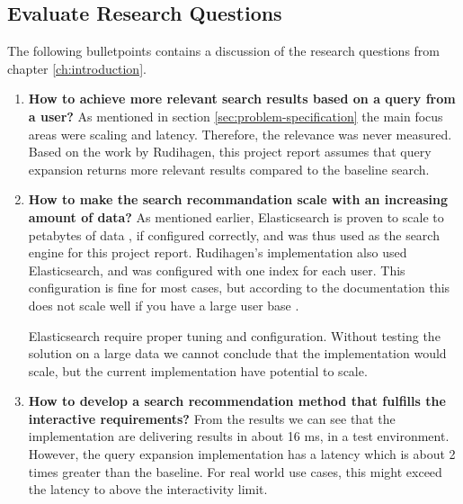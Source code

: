 \subsection{Evaluate Research Questions}
The following bulletpoints contains a discussion of the research questions from chapter \ref{ch:introduction}.

\begin{enumerate}
  \item \textbf{How to achieve more relevant search results based on a query from a user?} \newline
  As mentioned in section \ref{sec:problem-specification} the main focus areas were scaling and latency.
  Therefore, the relevance was never measured.
  Based on the work by Rudihagen,
  this project report assumes that query expansion returns more relevant results compared to the baseline search.

  \item\label{rq:scaling} \textbf{How to make the search recommandation scale with an increasing amount of data?} \newline
  As mentioned earlier, Elasticsearch is proven to scale to petabytes of data \cite{elasticsearch-scale},
  if configured correctly, and was thus used as the search engine for this project report.
  Rudihagen's implementation also used Elasticsearch, and was configured with one index for each user.
  This configuration is fine for most cases, but according to the documentation this does not scale well if you have a large user base \cite{elasticsearch-indices}.

  Elasticsearch require proper tuning and configuration.
  Without testing the solution on a large data we cannot conclude that the implementation would scale,
  but the current implementation have potential to scale.

  \item\label{rq:latency} \textbf{How to develop a search recommendation method that fulfills the interactive requirements?} \newline
  From the results we can see that the implementation are delivering results in about 16 ms, in a test environment.
  However, the query expansion implementation has a latency which is about 2 times greater than the baseline.
  For real world use cases, this might exceed the latency to above the interactivity limit.
\end{enumerate}
